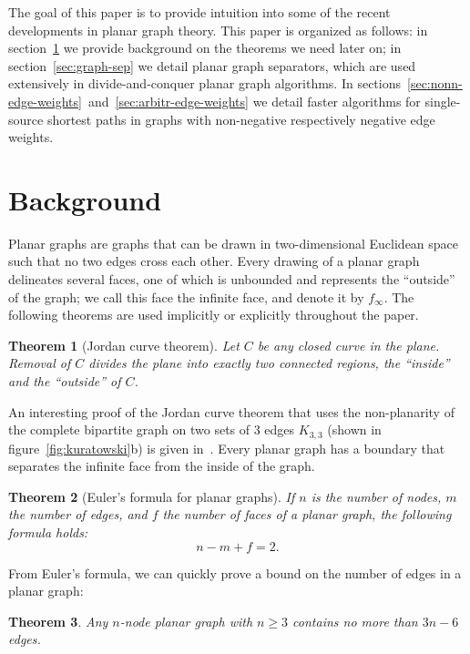 \documentclass[11pt]{article}
\newtheorem{theorem}{Theorem}[section]
\begin{document}
The goal of this paper is to provide intuition into some of the recent developments in planar graph theory. This paper is organized as follows: in section~\ref{sec:background} we provide background on the theorems we need later on; in section~\ref{sec:graph-sep} we detail planar graph separators, which are used extensively in divide-and-conquer planar graph algorithms. In sections~\ref{sec:nonn-edge-weights}~and~\ref{sec:arbitr-edge-weights} we detail faster algorithms for single-source shortest paths in graphs with non-negative respectively negative edge weights.

\section{Background}
\label{sec:background}

Planar graphs are graphs that can be drawn in two-dimensional Euclidean space such that no two edges cross each other. Every drawing of a planar graph delineates several faces, one of which is unbounded and represents the ``outside'' of the graph; we call this face the infinite face, and denote it by $f_{\infty}$. The following theorems are used implicitly or explicitly throughout the paper.\\

\begin{theorem}[Jordan curve theorem]
  Let $C$ be any closed curve in the plane. Removal of $C$ divides the plane into exactly two connected regions, the ``inside'' and the ``outside'' of $C$.
\end{theorem}

An interesting proof of the Jordan curve theorem that uses the non-planarity of the complete bipartite graph on two sets of 3 edges $K_{3,3}$ (shown in figure~\ref{fig:kuratowski}b) is given in~\cite{thomassen1992jordan}. Every planar graph has a boundary that separates the infinite face from the inside of the graph.\\

\begin{theorem}[Euler's formula for planar graphs]
  If $n$ is the number of nodes, $m$ the number of edges, and $f$ the number of faces of a planar graph, the following formula holds:
\[
  n - m + f = 2.
\]
\end{theorem}

From Euler's formula, we can quickly prove a bound on the number of edges in a planar graph:\\

\begin{theorem}
  Any $n$-node planar graph with $n \geq 3$ contains no more than $3n-6$ edges.\\
\end{theorem}
\end{document}
